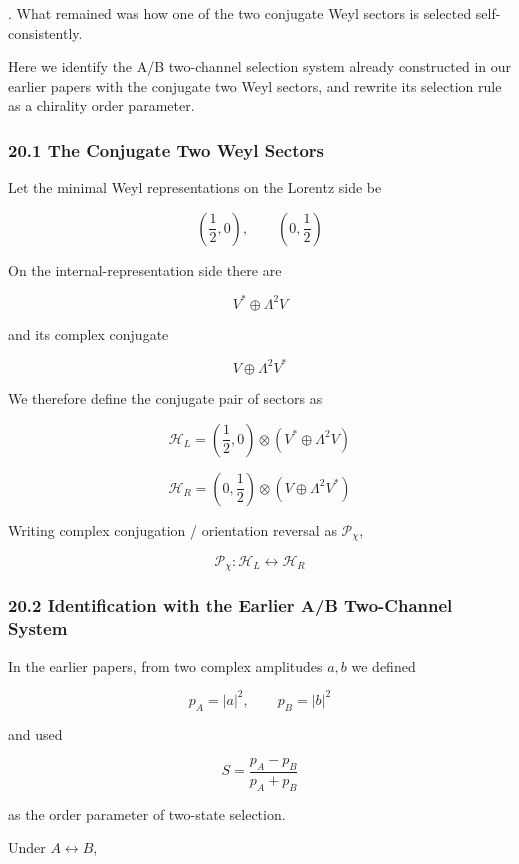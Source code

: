 \documentclass[
  a4paper,
]{article}
\begin{document}
. What remained was how one of the two conjugate Weyl sectors is
selected self-consistently.

Here we identify the A/B two-channel selection system already
constructed in our earlier papers with the conjugate two Weyl sectors,
and rewrite its selection rule as a chirality order parameter.

\subsubsection{20.1 The Conjugate Two Weyl
Sectors}\label{the-conjugate-two-weyl-sectors}

Let the minimal Weyl representations on the Lorentz side be

\[
\left(\frac12,0\right),
\qquad
\left(0,\frac12\right)
\]

On the internal-representation side there are

\[
V^*\oplus\Lambda^2V
\]

and its complex conjugate

\[
V\oplus\Lambda^2V^*
\]

We therefore define the conjugate pair of sectors as

\[
\boxed{
\mathcal H_L
=
\left(\frac12,0\right)
\otimes
\left(
V^*\oplus\Lambda^2V
\right)
}
\tag{148}
\]

\[
\boxed{
\mathcal H_R
=
\left(0,\frac12\right)
\otimes
\left(
V\oplus\Lambda^2V^*
\right)
}
\tag{149}
\]

Writing complex conjugation / orientation reversal as
\(\mathcal P_\chi\),

\[
\boxed{
\mathcal P_\chi:
\mathcal H_L
\leftrightarrow
\mathcal H_R
}
\tag{150}
\]

\subsubsection{20.2 Identification with the Earlier A/B Two-Channel
System}\label{identification-with-the-earlier-ab-two-channel-system}

In the earlier papers, from two complex amplitudes \(a,b\) we defined

\[
p_A=|a|^2,
\qquad
p_B=|b|^2
\]

and used

\[
\boxed{
S
=
\frac{p_A-p_B}{p_A+p_B}
}
\tag{151}
\]

as the order parameter of two-state selection.

Under \(A\leftrightarrow B\),
\end{document}
